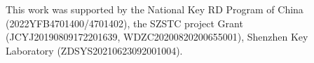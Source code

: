 \documentclass[10pt,twocolumn,letterpaper]{article}
\begin{document}
 This work was supported by the National Key RD Program of China (2022YFB4701400/4701402), the SZSTC project Grant (JCYJ20190809172201639, WDZC20200820200655001), Shenzhen Key Laboratory (ZDSYS20210623092001004).

{\small


}
\end{document}
